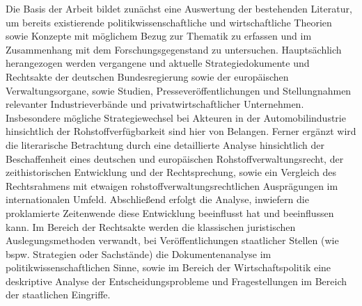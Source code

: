 \documentclass[12pt,a4paper,oneside]{book} %
\begin{document}
Die Basis der Arbeit bildet zunächst eine Auswertung der bestehenden Literatur, um bereits existierende politikwissenschaftliche und wirtschaftliche Theorien sowie Konzepte mit möglichem Bezug zur Thematik zu erfassen und im Zusammenhang mit dem Forschungsgegenstand zu untersuchen. Hauptsächlich herangezogen werden vergangene und aktuelle Strategiedokumente und Rechtsakte der deutschen Bundesregierung sowie der europäischen Verwaltungsorgane, sowie Studien, Presseveröffentlichungen und Stellungnahmen relevanter Industrieverbände und privatwirtschaftlicher Unternehmen. Insbesondere mögliche Strategiewechsel bei Akteuren in der Automobilindustrie hinsichtlich der Rohstoffverfügbarkeit sind hier von Belangen. Ferner ergänzt wird die literarische Betrachtung durch eine detaillierte Analyse hinsichtlich der Beschaffenheit eines deutschen und europäischen Rohstoffverwaltungsrecht, der zeithistorischen Entwicklung und der Rechtsprechung, sowie ein Vergleich des Rechtsrahmens mit etwaigen rohstoffverwaltungsrechtlichen Ausprägungen im internationalen Umfeld. Abschließend erfolgt die Analyse, inwiefern die proklamierte Zeitenwende diese Entwicklung beeinflusst hat und beeinflussen kann. Im Bereich der Rechtsakte werden die klassischen juristischen Auslegungsmethoden verwandt, bei Veröffentlichungen staatlicher Stellen (wie bspw. Strategien oder Sachstände) die Dokumentenanalyse im politikwissenschaftlichen Sinne,\autocite[203]{reh_quellen-_1995} sowie im Bereich der Wirtschaftspolitik eine deskriptive Analyse der Entscheidungsprobleme und Fragestellungen im Bereich der staatlichen Eingriffe.\autocite[6f.]{schmidt_theorie_2019}
\end{document}
